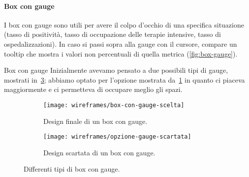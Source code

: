 \paragraph{Box con gauge}
I box con gauge sono utili per avere il colpo d'occhio di una specifica situazione (tasso di positività, tasso di occupazione delle terapie intensive, tasso di ospedalizzazioni). In caso si passi sopra alla gauge con il cursore, compare un tooltip che mostra i valori non percentuali di quella metrica (\ref{fig:box-gauge}).

\begin{bclogo}{Box con gauge}
    Inizialmente avevamo pensato a due possibili tipi di gauge, mostrati in~\ref{fig:opzioni-gauge}; abbiamo optato per l'opzione mostrata da~\ref{fig:opzione-gauge-finale} in quanto ci piaceva maggiormente e ci permetteva di occupare meglio gli spazi.

    \begin{figure}[H]
    \begin{subfigure}[b]{0.5\textwidth}
        \centering
        \texttt{[image: wireframes/box-con-gauge-scelta]}
        \caption{Design finale di un box con gauge.}\label{fig:opzione-gauge-finale}
    \end{subfigure}
\hfill
    \begin{subfigure}[b]{0.5\textwidth}
        \centering
        \texttt{[image: wireframes/opzione-gauge-scartata]}
        \caption{Design scartata di un box con gauge.}\label{fig:opzione-gauge-scartata}
    \end{subfigure}
    \caption{Differenti tipi di box con gauge.}\label{fig:opzioni-gauge}
\end{figure}

\end{bclogo}

